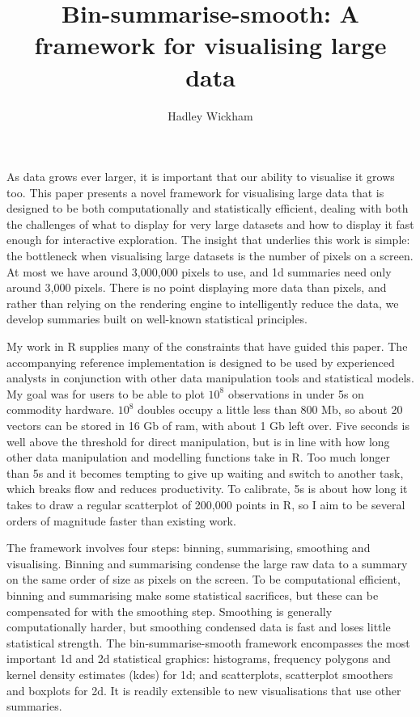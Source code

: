 \documentclass[journal]{vgtc}                %
\title{Bin-summarise-smooth: A framework for visualising large data}
\author{Hadley Wickham}
\begin{document}

\maketitle

As data grows ever larger, it is important that our ability to visualise it grows too. This paper presents a novel framework for visualising large data that is designed to be both computationally and statistically efficient, dealing with both the challenges of what to display for very large datasets and how to display it fast enough for interactive exploration. The insight that underlies this work is simple: the bottleneck when visualising large datasets is the number of pixels on a screen. At most we have around 3,000,000 pixels to use, and 1d summaries need only around 3,000 pixels. There is no point displaying more data than pixels, and rather than relying on the rendering engine to intelligently reduce the data, we develop summaries built on well-known statistical principles. 

My work in R supplies many of the constraints that have guided this paper. The accompanying reference implementation is designed to be used by experienced analysts in conjunction with other data manipulation tools and statistical models. My goal was for users to be able to plot $10^8$ observations in under 5s on commodity hardware. $10^8$ doubles occupy a little less than 800 Mb, so about 20 vectors can be stored in 16 Gb of ram, with about 1 Gb left over. Five seconds is well above the threshold for direct manipulation, but is in line with how long other data manipulation and modelling functions take in R. Too much longer than 5s and it becomes tempting to give up waiting and switch to another task, which breaks flow and reduces productivity. To calibrate, 5s is about how long it takes to draw a regular scatterplot of 200,000 points in R, so I aim to be several orders of magnitude faster than existing work.

The framework involves four steps: binning, summarising, smoothing and visualising. Binning and summarising condense the large raw data to a summary on the same order of size as pixels on the screen. To be computational efficient, binning and summarising make some statistical sacrifices, but these can be compensated for with the smoothing step. Smoothing is generally computationally harder, but smoothing condensed data is fast and loses little statistical strength. The bin-summarise-smooth framework encompasses the most important 1d and 2d statistical graphics: histograms, frequency polygons and kernel density estimates (kdes) for 1d; and scatterplots, scatterplot smoothers and boxplots for 2d. It is readily extensible to new visualisations that use other summaries.
\end{document}
